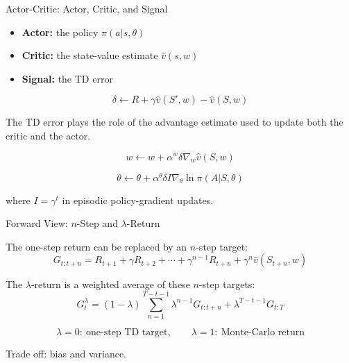 \documentclass{beamer}
\begin{document}
\begin{frame}{Actor-Critic: Actor, Critic, and Signal}

\small

\begin{itemize}
    \item \textbf{Actor:} the policy \(\pi(a|s,\theta)\)
    \item \textbf{Critic:} the state-value estimate \(\hat{v}(s,w)\)
    \item \textbf{Signal:} the TD error
\end{itemize}

\[
\delta
\leftarrow
R
+
\gamma \hat{v}(S',w)
-
\hat{v}(S,w)
\]

\vspace{0.1cm}

The TD error plays the role of the advantage estimate used to update both
the critic and the actor.

\[
w
\leftarrow
w
+
\alpha^w \delta
\nabla_w \hat{v}(S,w)
\]

\[
\theta
\leftarrow
\theta
+
\alpha^\theta \delta I
\nabla_\theta \ln \pi(A|S,\theta)
\]

where \(I=\gamma^t\) in episodic policy-gradient updates.

\end{frame}

\begin{frame}{Forward View: \(n\)-Step and \(\lambda\)-Return}

\small

The one-step return can be replaced by an \(n\)-step target:
\[
G_{t:t+n}
=
R_{t+1}
+
\gamma R_{t+2}
+
\cdots
+
\gamma^{n-1}R_{t+n}
+
\gamma^n \hat{v}(S_{t+n},w)
\]

\vspace{0.1cm}

The \(\lambda\)-return is a weighted average of these \(n\)-step targets:
\[
G_t^\lambda
=
(1-\lambda)
\sum_{n=1}^{T-t-1}
\lambda^{n-1}G_{t:t+n}
+
\lambda^{T-t-1}G_{t:T}
\]

\vspace{0.1cm}

\[
\lambda=0:\ \text{one-step TD target},
\qquad
\lambda=1:\ \text{Monte-Carlo return}
\]

Trade off: bias and variance.
\end{frame}
\end{document}
